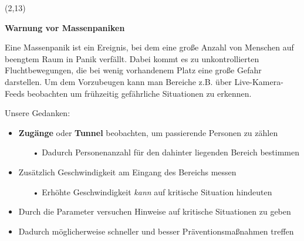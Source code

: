 \documentclass[%
textcolor=radacc_lightBlue,	%
pagecolor=radacc_darkblue,		%
]{../estposter}
\begin{document}
\begin{textblock}{12.5}(2,13)

\color{radacc_blue}
\textbf{Warnung vor Massenpaniken}
\par\smallskip

\color{radacc_lightBlue}
Eine Massenpanik ist ein Ereignis, bei dem eine große Anzahl von Menschen auf beengtem Raum in Panik verfällt. Dabei kommt es zu unkontrollierten Fluchtbewegungen, die bei wenig vorhandenem Platz eine große Gefahr darstellen. Um dem Vorzubeugen kann man Bereiche z.B. über Live-Kamera-Feeds beobachten um frühzeitig gefährliche Situationen zu erkennen. 

\par\smallskip

Unsere Gedanken:
\begin{itemize}[leftmargin=10pt, rightmargin=10pt, topsep=3pt,itemsep=1pt,partopsep=1pt, parsep=1pt]
\item \textbf{Zugänge} oder \textbf{Tunnel} beobachten, um passierende Personen zu zählen
		
	 	\begin{itemize}
			\item[•] Dadurch Personenanzahl für den dahinter liegenden Bereich bestimmen
		\end{itemize}
	
\item Zusätzlich Geschwindigkeit am Eingang des Bereichs messen
		
	 	\begin{itemize}
			\item[•] Erhöhte Geschwindigkeit \emph{kann} auf kritische Situation hindeuten
		\end{itemize}
		
\item Durch die Parameter versuchen Hinweise auf kritische Situationen zu geben
\item Dadurch möglicherweise schneller und besser Präventionsmaßnahmen treffen		
\end{itemize}




\par\bigskip
\par\bigskip
\par\bigskip
\par\bigskip
\par\bigskip
\par\bigskip
\par\bigskip
\par\bigskip
\par\bigskip
\par\bigskip
\par\bigskip



\end{textblock}
\end{document}
